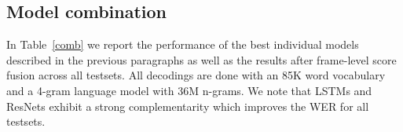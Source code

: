 \documentclass[a4paper]{article}
\begin{document}
\subsection{Model combination}
In Table~\ref{comb} we report the performance of the best individual
models described in the previous paragraphs as well as the results
after frame-level score fusion across all testsets. All decodings are
done with an 85K word vocabulary and a 4-gram language model with 36M
n-grams. We note that LSTMs and ResNets exhibit a strong
complementarity which improves the WER for all testsets.

\begin{table}[htpb!]
\begin{center}
\end{center}
\caption{\label{comb}
Word error rates for LSTMs and ResNet and frame-level score fusion results across all testsets (36M n-gram LM).}
\end{table}
\end{document}

